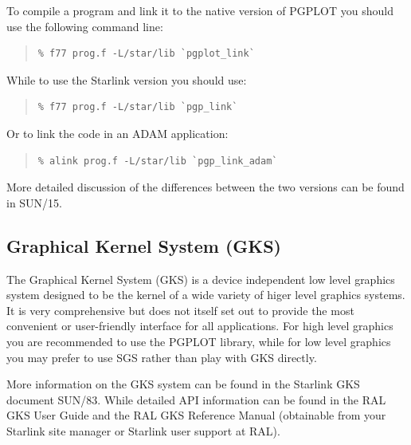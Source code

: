 \documentclass[twoside,11pt]{article}
\newcommand{\htmladdnormallink}[2]{#1}
\newcommand{\htmlref}[2]{#1}
\newcommand{\xref}[3]{#1}
\newcommand{\xlabel}[1]{}
\begin{document}
To compile a program and link it to the native version of PGPLOT you should use the following command line:

\small
\begin{quote}
\begin{verbatim}              
% f77 prog.f -L/star/lib `pgplot_link` 
\end{verbatim}
\end{quote}
\normalsize

While to use the Starlink version you should use:

\small
\begin{quote}
\begin{verbatim}   
% f77 prog.f -L/star/lib `pgp_link` 
\end{verbatim}
\end{quote}
\normalsize

Or to link the code in an \xref{ADAM}{sun113}{} application:

\small
\begin{quote}
\begin{verbatim}   
% alink prog.f -L/star/lib `pgp_link_adam` 
\end{verbatim}
\end{quote}
\normalsize

More detailed discussion of the differences between the two versions can be found in \xref{SUN/15}{sun15}{}.

\subsection{\xlabel{sc15_gks}Graphical Kernel System (GKS)\label{sc15_gks}}

The Graphical Kernel System (GKS) is a device independent low level graphics system designed to be the kernel of a wide variety of higer level graphics systems. It is very comprehensive but does not itself set out to provide the most convenient or user-friendly interface for all applications. For high level graphics you are recommended to use the \htmlref{PGPLOT}{sc15_pgplot} library, while for low level graphics you may prefer to use \htmlref{SGS}{sc15_sgs} rather than play with GKS directly.

More information on the GKS system can be found in the Starlink GKS document \xref{SUN/83}{sun83}{}. While detailed API information can be found in the \htmladdnormallink{RAL GKS User Guide}{http://www.itd.clrc.ac.uk/Publications/RAL-GKS/gksguide.html} and the \htmladdnormallink{RAL GKS Reference Manual}{http://www.itd.clrc.ac.uk/Publications/RAL-GKS/gks_cat.html} (obtainable from your Starlink site manager or Starlink user support at RAL).
\end{document}
